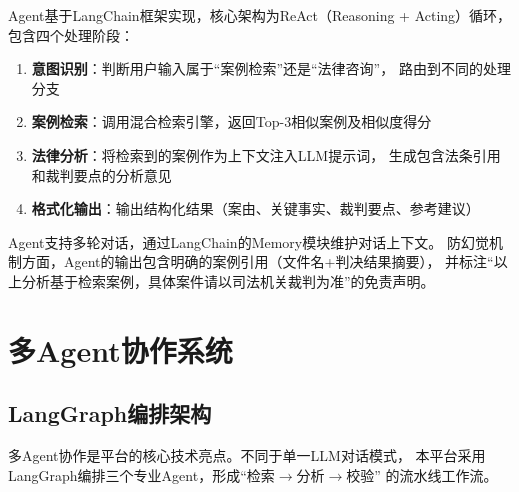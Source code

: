 \documentclass[12pt,a4paper,twoside]{ctexart}
\begin{document}
Agent基于LangChain框架实现，核心架构为ReAct（Reasoning + Acting）循环，
包含四个处理阶段：

\begin{enumerate}[leftmargin=*,itemsep=2pt]
    \item \textbf{意图识别}：判断用户输入属于``案例检索''还是``法律咨询''，
          路由到不同的处理分支
    \item \textbf{案例检索}：调用混合检索引擎，返回Top-3相似案例及相似度得分
    \item \textbf{法律分析}：将检索到的案例作为上下文注入LLM提示词，
          生成包含法条引用和裁判要点的分析意见
    \item \textbf{格式化输出}：输出结构化结果（案由、关键事实、裁判要点、参考建议）
\end{enumerate}

Agent支持多轮对话，通过LangChain的Memory模块维护对话上下文。
防幻觉机制方面，Agent的输出包含明确的案例引用（文件名+判决结果摘要），
并标注``以上分析基于检索案例，具体案件请以司法机关裁判为准''的免责声明。

\section{多Agent协作系统}

\subsection{LangGraph编排架构}

多Agent协作是平台的核心技术亮点。不同于单一LLM对话模式，
本平台采用LangGraph\cite{langgraph}编排三个专业Agent，形成``检索$\rightarrow$分析$\rightarrow$校验''
的流水线工作流。
\end{document}
